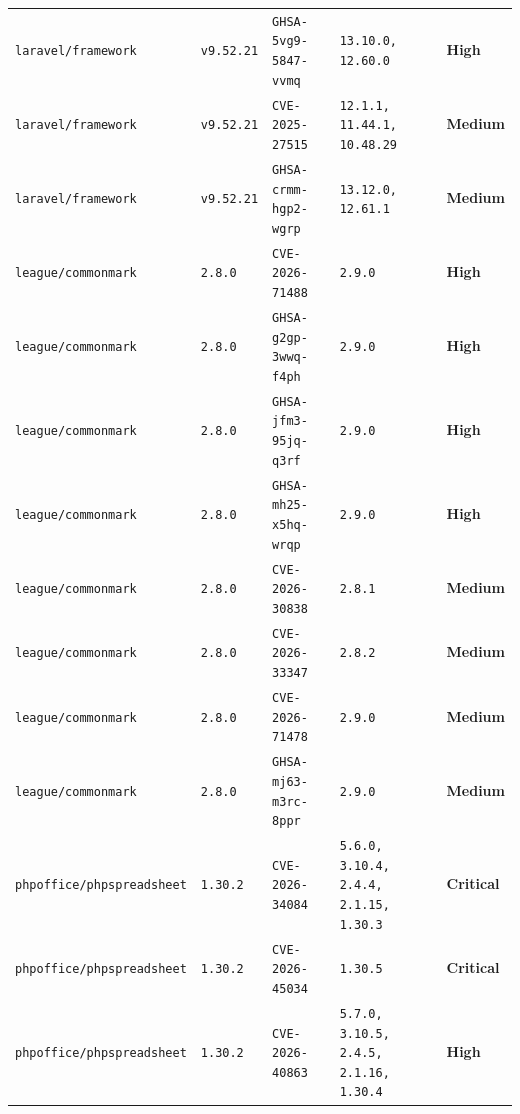 \documentclass[11pt,a4paper]{article}
\newcommand{\sevbadge}[1]{\textbf{\textcolor{sev#1}{#1}}}
\begin{document}
{\begin{longtable}{@{}>{\raggedright\arraybackslash}p{} l >{\raggedright\arraybackslash}p{} l l@{}}
\texttt{\small laravel/\allowbreak{}framework} & \texttt{\small v9.52.21} & \texttt{\small GHSA-5vg9-5847-vvmq} & \texttt{\small 13.10.0, 12.60.0} & \sevbadge{High}\\
\texttt{\small laravel/\allowbreak{}framework} & \texttt{\small v9.52.21} & \texttt{\small CVE-2025-27515} & \texttt{\small 12.1.1, 11.44.1, 10.48.29} & \sevbadge{Medium}\\
\texttt{\small laravel/\allowbreak{}framework} & \texttt{\small v9.52.21} & \texttt{\small GHSA-crmm-hgp2-wgrp} & \texttt{\small 13.12.0, 12.61.1} & \sevbadge{Medium}\\
\texttt{\small league/\allowbreak{}commonmark} & \texttt{\small 2.8.0} & \texttt{\small CVE-2026-71488} & \texttt{\small 2.9.0} & \sevbadge{High}\\
\texttt{\small league/\allowbreak{}commonmark} & \texttt{\small 2.8.0} & \texttt{\small GHSA-g2gp-3wwq-f4ph} & \texttt{\small 2.9.0} & \sevbadge{High}\\
\texttt{\small league/\allowbreak{}commonmark} & \texttt{\small 2.8.0} & \texttt{\small GHSA-jfm3-95jq-q3rf} & \texttt{\small 2.9.0} & \sevbadge{High}\\
\texttt{\small league/\allowbreak{}commonmark} & \texttt{\small 2.8.0} & \texttt{\small GHSA-mh25-x5hq-wrqp} & \texttt{\small 2.9.0} & \sevbadge{High}\\
\texttt{\small league/\allowbreak{}commonmark} & \texttt{\small 2.8.0} & \texttt{\small CVE-2026-30838} & \texttt{\small 2.8.1} & \sevbadge{Medium}\\
\texttt{\small league/\allowbreak{}commonmark} & \texttt{\small 2.8.0} & \texttt{\small CVE-2026-33347} & \texttt{\small 2.8.2} & \sevbadge{Medium}\\
\texttt{\small league/\allowbreak{}commonmark} & \texttt{\small 2.8.0} & \texttt{\small CVE-2026-71478} & \texttt{\small 2.9.0} & \sevbadge{Medium}\\
\texttt{\small league/\allowbreak{}commonmark} & \texttt{\small 2.8.0} & \texttt{\small GHSA-mj63-m3rc-8ppr} & \texttt{\small 2.9.0} & \sevbadge{Medium}\\
\texttt{\small phpoffice/\allowbreak{}phpspreadsheet} & \texttt{\small 1.30.2} & \texttt{\small CVE-2026-34084} & \texttt{\small 5.6.0, 3.10.4, 2.4.4, 2.1.15, 1.30.3} & \sevbadge{Critical}\\
\texttt{\small phpoffice/\allowbreak{}phpspreadsheet} & \texttt{\small 1.30.2} & \texttt{\small CVE-2026-45034} & \texttt{\small 1.30.5} & \sevbadge{Critical}\\
\texttt{\small phpoffice/\allowbreak{}phpspreadsheet} & \texttt{\small 1.30.2} & \texttt{\small CVE-2026-40863} & \texttt{\small 5.7.0, 3.10.5, 2.4.5, 2.1.16, 1.30.4} & \sevbadge{High}\\

\end{longtable}}
\end{document}
